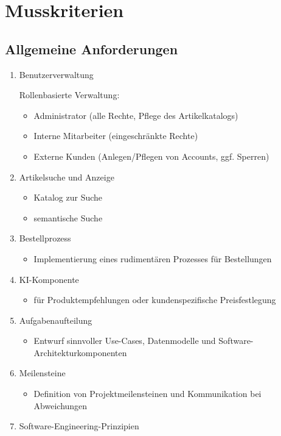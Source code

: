\documentclass[%
	ngerman,
	12pt,
	a4paper,
	oneside
]{scrbook}
\begin{document}
\section{Musskriterien}
	\subsection{Allgemeine Anforderungen}
	\begin{enumerate}
		\item Benutzerverwaltung

		Rollenbasierte Verwaltung:
		\begin{itemize}
			\item Administrator (alle Rechte, Pflege des Artikelkatalogs)
			\item Interne Mitarbeiter (eingeschränkte Rechte)
			\item Externe Kunden (Anlegen/Pflegen von Accounts, ggf. Sperren)
		\end{itemize}
		\item Artikelsuche und Anzeige
		\begin{itemize}
			\item Katalog zur Suche
			\item semantische Suche
		\end{itemize}
		\item Bestellprozess
		\begin{itemize}
			\item Implementierung eines rudimentären Prozesses für Bestellungen
		\end{itemize}
		\item KI-Komponente
		\begin{itemize}
			\item für Produktempfehlungen oder kundenspezifische Preisfestlegung
		\end{itemize}
		\item Aufgabenaufteilung
		\begin{itemize}
			\item Entwurf sinnvoller Use-Cases, Datenmodelle und Software-Architekturkomponenten
		\end{itemize}
		\item Meilensteine
		\begin{itemize}
			\item Definition von Projektmeilensteinen und Kommunikation bei Abweichungen
		\end{itemize}
		\item Software-Engineering-Prinzipien
		\begin{itemize}

\end{itemize}
\end{enumerate}
\end{document}

